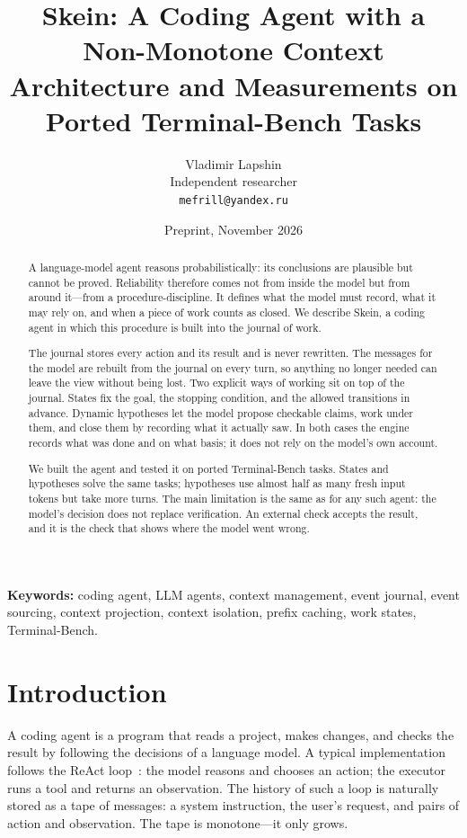 \documentclass[11pt,a4paper]{article}
\title{\textbf{Skein: A Coding Agent with a Non-Monotone Context}\\[0.4em]
\large Architecture and Measurements on Ported Terminal-Bench Tasks}
\author{Vladimir Lapshin\\[0.3em]
\small Independent researcher\\[0.2em]
\small \texttt{mefrill@yandex.ru}}
\date{Preprint, November 2026}
\begin{document}
\maketitle

\begin{abstract}
A language-model agent reasons probabilistically: its conclusions are plausible but cannot be
proved. Reliability therefore comes not from inside the model but from around it---from a
procedure-discipline. It defines what the model must record, what it may rely on, and when a
piece of work counts as closed. We describe Skein, a coding agent in which this procedure is
built into the journal of work.

The journal stores every action and its result and is never rewritten. The messages for the model
are rebuilt from the journal on every turn, so anything no longer needed can leave the view
without being lost. Two explicit ways of working sit on top of the journal. States fix the goal,
the stopping condition, and the allowed transitions in advance. Dynamic hypotheses let the model
propose checkable claims, work under them, and close them by recording what it actually saw. In
both cases the engine records what was done and on what basis; it does not rely on the model's
own account.

We built the agent and tested it on ported Terminal-Bench tasks. States and hypotheses solve the
same tasks; hypotheses use almost half as many fresh input tokens but take more turns. The main
limitation is the same as for any such agent: the model's decision does not replace verification.
An external check accepts the result, and it is the check that shows where the model went wrong.
\end{abstract}

\noindent\textbf{Keywords:} coding agent, LLM agents, context management, event journal, event
sourcing, context projection, context isolation, prefix caching, work states, Terminal-Bench.

\section{Introduction}

A coding agent is a program that reads a project, makes changes, and checks the result by
following the decisions of a language model. A typical implementation follows the ReAct
loop~\cite{yao2023react}: the model reasons and chooses an action; the executor runs a tool and
returns an observation. The history of such a loop is naturally stored as a tape of messages:
a system instruction, the user's request, and pairs of action and observation. The tape is
monotone---it only grows.
\end{document}
